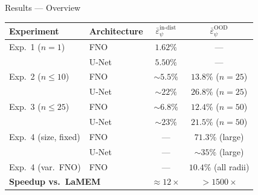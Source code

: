 \documentclass[aspectratio=169, 10pt]{beamer}
\begin{document}
\begin{frame}{Results — Overview}
  \begin{center}
  \begin{tabular}{llcc}
    \toprule
    \textbf{Experiment} & \textbf{Architecture} & $\bar{\varepsilon}_\psi^{\text{in-dist}}$ & $\bar{\varepsilon}_\psi^{\text{OOD}}$ \\
    \midrule
    Exp.~1 ($n=1$) & \textcolor{fnocolor}{FNO}   & $1.62\%$      & — \\
                   & \textcolor{unetcolor}{U-Net} & $5.50\%$      & — \\
    \midrule
    Exp.~2 ($n\leq10$) & \textcolor{fnocolor}{FNO}   & ${\sim}5.5\%$  & $13.8\%$ ($n=25$) \\
                       & \textcolor{unetcolor}{U-Net} & ${\sim}22\%$  & $26.8\%$ ($n=25$) \\
    \midrule
    Exp.~3 ($n\leq25$) & \textcolor{fnocolor}{FNO}   & ${\sim}6.8\%$  & $12.4\%$ ($n=50$) \\
                       & \textcolor{unetcolor}{U-Net} & ${\sim}23\%$  & $21.5\%$ ($n=50$) \\
    \midrule
    Exp.~4 (size, fixed) & \textcolor{fnocolor}{FNO}   & — & $71.3\%$ (large) \\
                         & \textcolor{unetcolor}{U-Net} & — & ${\sim}35\%$ (large) \\
    Exp.~4 (var.\ FNO)   & \textcolor{fnocolor}{FNO}   & — & $10.4\%$ (all radii) \\
    \midrule
    \multicolumn{2}{l}{\textbf{Speedup vs.\ LaMEM}} & \textcolor{fnocolor}{${\approx}12\times$} & \textcolor{unetcolor}{${>}1500\times$} \\
    \bottomrule
  \end{tabular}
  \end{center}
\end{frame}
\end{document}
